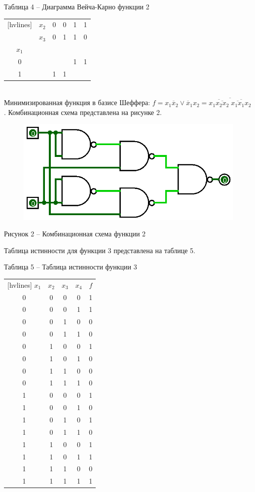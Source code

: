 \documentclass[a4paper,14pt]{extarticle}
\begin{document}
  \noindent Таблица 4 -- Диаграмма Вейча-Карно функции 2 \\
  \begin{NiceTabular}{cccccc}[hvlines]
    & $x_2$ & 0 & 0 & 1 & 1 \\
    & $x_3$ & 0 & 1 & 1 & 0 \\
    $x_1$ & & & & & \\
    0 & & & & 1 & 1 \\
    1 & & 1 & 1 & &
  \end{NiceTabular}\\
  
  Минимизированная функция в базисе Шеффера: $f=x_1\overline{x}_2\lor\overline{x}_1x_2=\overline{
    \overline{x_1\overline{x_2x_2}}\;
    \overline{\overline{x_1x_1}x_2}
  }$. Комбинационная схема представлена на рисунке 2.
  
  \begin{figure}[h]
    \centering
    \includegraphics[width=0.5\linewidth]{images/s-1-2}
  \end{figure}
  \begin{center}
    Рисунок 2 – Комбинационная схема функции 2
  \end{center}
  
  \pagebreak
  Таблица истинности для функции 3 представлена на таблице 5.
  
  \noindent Таблица 5 -- Таблица истинности функции 3 \\
  \begin{NiceTabular}{ccccc}[hvlines]
    $x_1$ & $x_2$ & $x_3$ & $x_4$ & $f$ \\
    0 & 0 & 0 & 0 & 1 \\
    0 & 0 & 0 & 1 & 1 \\
    0 & 0 & 1 & 0 & 0 \\
    0 & 0 & 1 & 1 & 0 \\
    0 & 1 & 0 & 0 & 1 \\
    0 & 1 & 0 & 1 & 0 \\
    0 & 1 & 1 & 0 & 0 \\
    0 & 1 & 1 & 1 & 0 \\
    1 & 0 & 0 & 0 & 1 \\
    1 & 0 & 0 & 1 & 0 \\
    1 & 0 & 1 & 0 & 1 \\
    1 & 0 & 1 & 1 & 0 \\
    1 & 1 & 0 & 0 & 1 \\
    1 & 1 & 0 & 1 & 1 \\
    1 & 1 & 1 & 0 & 0 \\
    1 & 1 & 1 & 1 & 1
  \end{NiceTabular}\\
  
\end{document}
